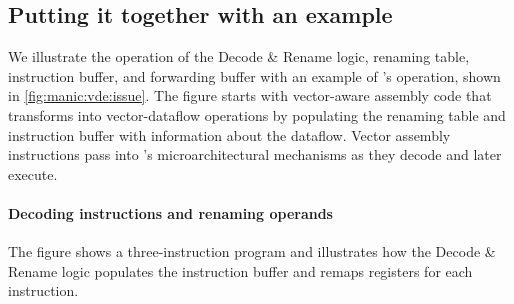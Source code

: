 \subsection{Putting it together with an example}
We illustrate the operation of the Decode \& Rename logic, renaming table, instruction
buffer, and forwarding buffer with an example of \manic's operation, shown in
\autoref{fig:manic:vde:issue}. 
%
The figure starts with vector-aware assembly code that \manic transforms into
vector-dataflow operations by populating the renaming table and instruction
buffer with information about the dataflow.
%
Vector assembly instructions pass into \manic's microarchitectural mechanisms
as they decode and later execute.
%

\figMANICMANICa

\paragraph{Decoding instructions and renaming operands}
The figure shows a three-instruction program and illustrates how
the Decode \& Rename logic populates the instruction buffer and remaps registers for each
instruction.

